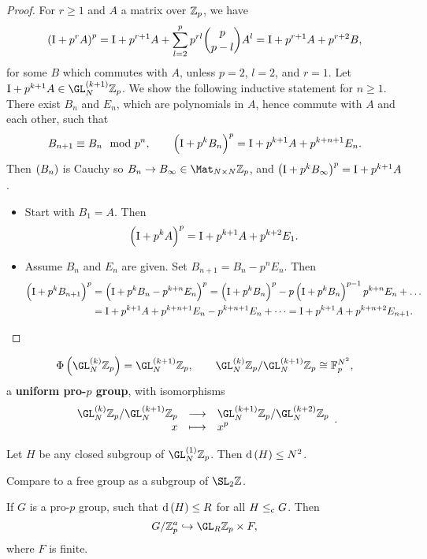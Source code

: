 \begin{proof}
For $ r \ge 1 $ and $ A $ a matrix over $ \mathbb{Z}_p $, we have
$$ \br{\I + p^rA}^p = \I + p^{r + 1}A + \sum_{l = 2}^p p^{rl}\binom{p}{p - l}A^l = \I + p^{r + 1}A + p^{r + 2}B, $$
for some $ B $ which commutes with $ A $, unless $ p = 2 $, $ l = 2 $, and $ r = 1 $. Let $ \I + p^{k + 1}A \in \GL_N^{\br{k + 1}} \ZZ_p $. We show the following inductive statement for $ n \ge 1 $. There exist $ B_n $ and $ E_n $, which are polynomials in $ A $, hence commute with $ A $ and each other, such that
$$ B_{n + 1} \equiv B_n \mod p^n, \qquad \br{\I + p^kB_n}^p = \I + p^{k + 1}A + p^{k + n + 1}E_n. $$
Then $ \br{B_n} $ is Cauchy so $ B_n \to B_\infty \in \Mat_{N \times N} \ZZ_p $, and $ \br{\I + p^kB_\infty}^p = \I + p^{k + 1}A $.
\begin{itemize}
\item Start with $ B_1 = A $. Then
$$ \br{\I + p^kA}^p = \I + p^{k + 1}A + p^{k + 2}E_1. $$
\item Assume $ B_n $ and $ E_n $ are given. Set $ B_{n + 1} = B_n - p^nE_n $. Then
\begin{align*}
\br{\I + p^kB_{n + 1}}^p
& = \br{\I + p^kB_n - p^{k + n}E_n}^p
= \br{\I + p^kB_n}^p - p\br{\I + p^kB_n}^{p - 1}p^{k + n}E_n + \dots \\
& = \I + p^{k + 1}A + p^{k + n + 1}E_n - p^{k + n + 1}E_n + \dots
= \I + p^{k + 1}A + p^{k + n + 2}E_{n + 1}.
\end{align*}
\end{itemize}
\end{proof}

\begin{proposition}
$$ \Phi\br{\GL_N^{\br{k}} \ZZ_p} = \GL_N^{\br{k + 1}} \ZZ_p, \qquad \GL_N^{\br{k}} \ZZ_p / \GL_N^{\br{k + 1}} \ZZ_p \cong \FF_p^{N^2}, $$
a \textbf{uniform pro-$ p $ group}, with isomorphisms
$$ \function{\GL_N^{\br{k}} \ZZ_p / \GL_N^{\br{k + 1}} \ZZ_p}{\GL_N^{\br{k + 1}} \ZZ_p / \GL_N^{\br{k + 2}} \ZZ_p}{x}{x^p}. $$
\end{proposition}

\begin{theorem}
Let $ H $ be any closed subgroup of $ \GL_N^{\br{1}} \ZZ_p $. Then $ \d\br{H} \le N^2 $.
\end{theorem}

Compare to a free group as a subgroup of $ \SL_2 \ZZ $.

\begin{theorem}
If $ G $ is a pro-$ p $ group, such that $ \d\br{H} \le R $ for all $ H \le_{\mathrm{c}} G $. Then
$$ G / \ZZ_p^a \hookrightarrow \GL_R \ZZ_p \times F, $$
where $ F $ is finite.
\end{theorem}

